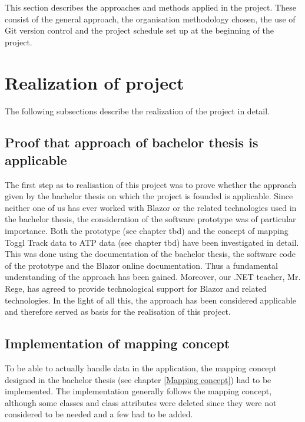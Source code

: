 
This section describes the approaches and methods applied in the project. These consist of the general approach, the organisation methodology chosen, the use of Git version control and the project schedule set up at the beginning of the project.

\section{Realization of project}
The following subsections describe the realization of the project in detail.

\subsection{Proof that approach of bachelor thesis is applicable}
The first step as to realisation of this project was to prove whether the approach given by the bachelor thesis on which the project is founded is applicable. Since neither one of us has ever worked with Blazor or the related technologies used in the bachelor thesis, the consideration of the software prototype was of particular importance. Both the prototype (see chapter tbd) and the concept of mapping Toggl Track data to ATP data (see chapter tbd) have been investigated in detail. This was done using the documentation of the bachelor thesis, the software code of the prototype and the Blazor online documentation. Thus a fundamental understanding of the approach has been gained. Moreover, our .NET teacher, Mr. Rege, has agreed to provide technological support for Blazor and related technologies. In the light of all this, the approach has been considered applicable and therefore served as basis for the realisation of this project.

\subsection{Implementation of mapping concept}
To be able to actually handle data in the application, the mapping concept designed in the bachelor thesis (see chapter \ref{Mapping concept}) had to be implemented. The implementation generally follows the mapping concept, although some classes and class attributes were deleted since they were not considered to be needed and a few had to be added.

